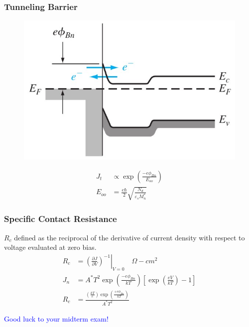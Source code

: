 \documentclass{beamer}
\begin{document}
    \begin{frame} \frametitle{Tunneling Barrier}
        \begin{figure}[H]
            \centering
            \includegraphics[width=0.6\linewidth]{Tunneling-barrier.jpg}
            \label{fig:Tunneling-barrier.jpg}
        \end{figure}
        \begin{equation*}
            \begin{aligned}
                J_t & \propto \exp \left( \frac{-e \phi_{Bn} }{E_{oo} }  \right) \\
                E_{oo} &= \frac{e \hbar}{2} \sqrt{\frac{N_d}{\varepsilon_s M_n^*} } 
            \end{aligned}
        \end{equation*}
    \end{frame}

    \begin{frame} \frametitle{Specific Contact Resistance}
        \par $R_c$ defined as the reciprocal of the derivative of current density with respect to voltage evaluated at zero bias.
        \begin{equation*}
            \begin{aligned}
                R_c &= \left. \left( \frac{\partial J}{\partial V}  \right)^{-1} \right|_{V = 0} \quad \Omega-cm^{2}  \\
                J_n &= A^* T^2 \exp \left( \frac{-e \phi_{Bn}}{kT}  \right) \left[ \exp \left( \frac{eV}{kT}  \right) - 1 \right] \\
                R_c &= \frac{\left(\frac{kT}{e} \right) \exp \left( \frac{+e \phi_{Bn} }{kT}  \right)}{A^* T^2} 
            \end{aligned}
        \end{equation*}
    \end{frame}

    \begin{frame} 
        \begin{center}
            \Large\textcolor{blue}{Good luck to your midterm exam!}
        \end{center}
    \end{frame}
\end{document}
